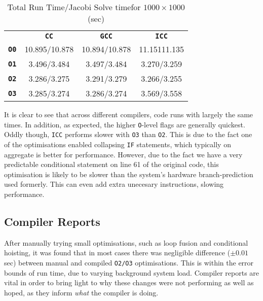 \documentclass[10pt,twocolumn,a4paper]{article}
\begin{document}
\vspace{-0.25cm}
\begin{table}[h]
\small
\centering
\begin{tabular}{l|c|c|c}
       & \textbf{\texttt{CC}} & \textbf{\texttt{GCC}} & \textbf{\texttt{ICC}} \\
\textbf{\texttt{O0}} & 10.895/10.878 & 10.894/10.878 & 11.15111.135 \\
\textbf{\texttt{O1}} & 3.496/3.484   & 3.497/3.484   & 3.270/3.259  \\
\textbf{\texttt{O2}} & 3.286/3.275   & 3.291/3.279   & 3.266/3.255  \\
\textbf{\texttt{O3}} & 3.285/3.274   & 3.286/3.274   & 3.569/3.558
\end{tabular}
\caption{Total Run Time/Jacobi Solve time\newline for $1000\times1000$ (sec)}
\label{stockResults}
\end{table}\par
\vspace{-0.35cm}

It is clear to see that across different compilers, code runs with largely the same times. In addition, as expected, the higher \texttt{O}-level flags are generally quickest. Oddly though, \texttt{ICC} performs slower with \texttt{O3} than \texttt{O2}. This is due to the fact one of the optimisations enabled collapsing \texttt{IF} statements, which typically on aggregate is better for performance. However, due to the fact we have a very predictable conditional statement on line 61 of the original code\cite{hpc-cw1-code}, this optimisation is likely to be slower than the system's hardware branch-prediction used formerly. This can even add extra unecesary instructions, slowing performance. \par

\subsection{Compiler Reports}
After manually trying small optimisations, such as loop fusion and conditional hoisting, it was found that in most cases there was negligible difference ($\pm0.01$sec) between manual and compiled \texttt{O2/O3} optimisations. This is within the error bounds of run time, due to varying background system load. Compiler reports are vital in order to bring light to why these changes were not performing as well as hoped, as they inform \textit{what} the compiler is doing.


\end{document}
